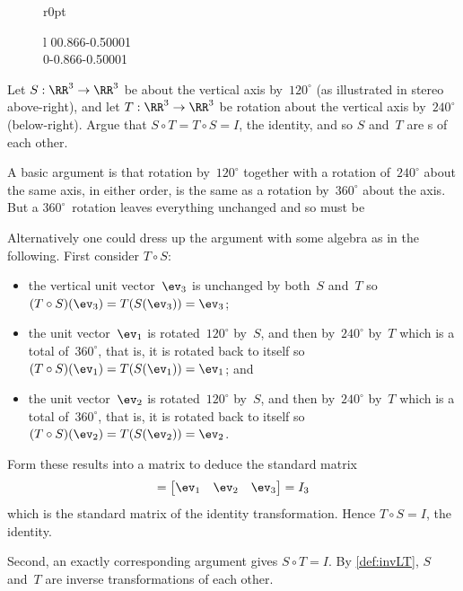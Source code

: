 \begin{figure}[12]r{0pt}
\begin{tabular}l
0{0.866}{-0.5}0001
\\
0{-0.866}{-0.5}0001
\end{tabular}
\end{figure}
\begin{example}  
Let \(S:\RR^3\to\RR^3\) be  about the vertical axis by~\(120^\circ\) (as illustrated in stereo above-right), 
and let \(T:\RR^3\to\RR^3\) be rotation about the vertical axis by~\(240^\circ\) (below-right).
Argue that \(S\circ T=T\circ S=I\), the identity, and so \(S\) 
and~\(T\) are s of each other.

\begin{solution} 
A basic argument is that rotation by~\(120^\circ\) together with a rotation of~\(240^\circ\) about the same axis, in either order, is the same as a rotation by~\(360^\circ\) about the axis.
But a \(360^\circ\)~rotation leaves everything unchanged and so must be 

Alternatively one could dress up the argument with some algebra as in the following.
First consider \(T\circ S\):
\begin{itemize}
\item the vertical unit vector~\(\ev_3\) is unchanged by both~\(S\) and~\(T\) so \((T\circ S)(\ev_3)=T(S(\ev_3))=\ev_3\);
\item the unit vector~\(\ev_1\) is rotated~\(120^\circ\) by~\(S\), and then by~\(240^\circ\) by~\(T\) which is a total of~\(360^\circ\), that is, it is rotated back to itself so \((T\circ S)(\ev_1)=T(S(\ev_1))=\ev_1\); and
\item the unit vector~\(\ev_2\) is rotated~\(120^\circ\) by~\(S\), and then by~\(240^\circ\) by~\(T\) which is a total of~\(360^\circ\), that is, it is rotated back to itself so \((T\circ S)(\ev_2)=T(S(\ev_2))=\ev_2\).
\end{itemize}
Form these results into a matrix to deduce the standard matrix
\begin{equation*}
[T\circ S]=\begin{bmatrix} \ev_1&\ev_2&\ev_3 \end{bmatrix}
=I_3
\end{equation*}
which is the standard matrix of the identity transformation.
Hence \(T\circ S=I\), the identity.

Second, an exactly corresponding argument gives  \(S\circ T=I\).
By \cref{def:invLT}, \(S\) and~\(T\) are inverse transformations of each other.
\end{solution}
\end{example}

